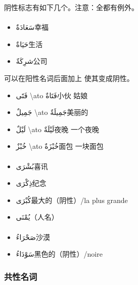 阴性标志有如下几个。注意：全都有例外。

\paragraph{} 

\begin{itemize}
    \item \ac{سَعَادَةٌ}{幸福}
    \item \ac{حَيَاةٌ}{生活}
    \item \ac{شرِكَةٌ}{公司}
\end{itemize}

可以在阳性名词后面加上  使其变成阴性。

\begin{itemize}
    \item \ac{فَتََى \ato فَتَاةٌ}{小伙 \cto 姑娘}
    \item \ac{جَمِيلٌ \ato جَمِيلَةٌ}{美丽的}
    \item \ac{لَيْلٌ \ato لَيْلَةٌ}{夜晚 \cto 一个夜晚}
    \item \ac{خُبْزٌ \ato خُبْزَةٌ}{面包 \cto 一块面包}
\end{itemize}

\paragraph{}

\begin{itemize}
    \item \ac{بُشْرَى}{喜讯}
    \item \ac{ذِكْرَى}{纪念}
    \item \ac{كُبْرَى}{最大的（阴性）/la plus grande}
    \item \ac{يُمْنَى}{（人名）}
\end{itemize}

\paragraph{}

\begin{itemize}
    \item \ac{صَحْرَاءُ}{沙漠}
    \item \ac{سَوْدَاءُ}{黑色的（阴性）/noire}
\end{itemize}

\subsubsection{共性名词}

